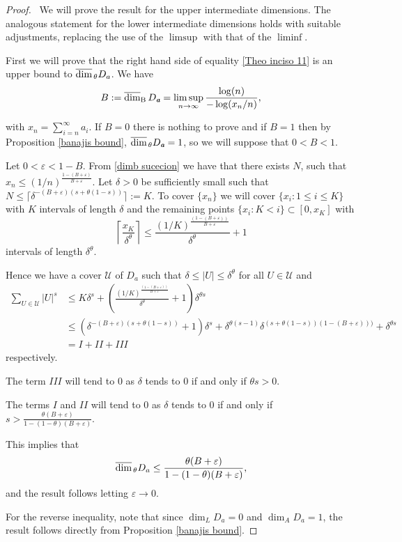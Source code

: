 \documentclass[11pt,reqno,bookmarksnumbered,raiselinks,breaklinks,colorlinks,plainpages]{amsart}
\renewcommand{\epsilon}{\varepsilon}
\newcommand\ubd{\overline{\mbox{\rm dim}}_{\rm B}\,} %
\newcommand\uda{\overline{\mbox{\rm dim}}_{\,\theta}} %
\begin{document}
\begin{proof}\ We will prove the result for the upper intermediate dimensions. The analogous statement for the lower intermediate dimensions holds with suitable adjustments, replacing the use of the $\limsup$ with that of the $\liminf$.

    First we will prove that the right hand side of equality \eqref{Theo inciso 11} is an upper bound to $\uda D_a$.
    We have \begin{equation}\label{dimb sucecion} B:=\ubd D_{\textit{\textbf{a}}}=\displaystyle\limsup_{n\to\infty}\frac{\log (n)}{-\log(x_n/n)}, \end{equation}

with $x_n=\displaystyle\sum_{i=n}^{\infty}a_i$.    
If $B=0$ there is nothing to prove and if $B=1$ then by Proposition \ref{banajis bound}, $\uda D_{\textit{\textbf{a}}}=1$, so we will suppose that $0<B<1$. 

Let $0<\epsilon<1-B$.  
From \eqref{dimb sucecion} we have that there exists $N$, such that $x_n\leq (1/n)^{\frac{1-(B+\epsilon)}{B+\epsilon}}$.
Let $\delta>0$ be sufficiently small such that $N\leq \lceil \delta^{-(B+\epsilon)(s+\theta(1-s))}\rceil:=K.$ 
To cover $\{x_n\}$ we will cover $\{x_i : 1\leq i \leq K\}$ with $K$ intervals of length $\delta$ and the remaining points $\{x_i : K<i\}\subset [0, x_K]$ with 
$$\left\lceil \frac{x_K}{\delta^{\theta}}\right\rceil\leq \frac{(1/K)^{\frac{(1-(B+\epsilon))}{B+\epsilon}}}{\delta^{\theta} }+1$$ intervals of length $\delta^{\theta}$. 

Hence we have a cover $\mathcal{U}$ of $D_a$ such that $\delta\leq |U|\leq \delta^{\theta}$ for all $U\in \mathcal{U}$ and 
\begin{align*}
    \sum_{U\in\mathcal{U}} |U|^{s}&\leq K\delta^{s}+\left(\frac{(1/K)^{\frac{(1-(B+\epsilon))}{B+\epsilon}}}{\delta^{\theta}} +1\right)\delta^{\theta s}\\
    &\leq (\delta^{-(B+\epsilon)(s+\theta(1-s))}+1)\delta^{s} + \delta^{\theta(s-1)}\delta^{(s+\theta(1-s))(1-(B+\epsilon)))} + \delta^{\theta s}\\
    &=I+I\!I+I\!I\!I
\end{align*}
respectively.

The term $I\!I\!I$ will tend to $0$ as $\delta$ tends to $0$  if and only if $\theta s >0$.

The terms $I$ and $I\!I$ will tend to $0$ as $\delta$ tends to $0$ if and only if $s>\frac{\theta (B+\epsilon)}{1-(1-\theta)(B+\epsilon)}.$

This implies that 
$$\uda D_a\leq \frac{\theta (B+\epsilon)}{1-(1-\theta)(B+\epsilon)},$$
and the result follows letting $\epsilon\to 0.$ 

For the reverse inequality, note that since \( \dim_L D_a = 0 \) and \( \dim_A D_a = 1 \), the result follows directly from Proposition \ref{banajis bound}.


\end{proof}
\end{document}
